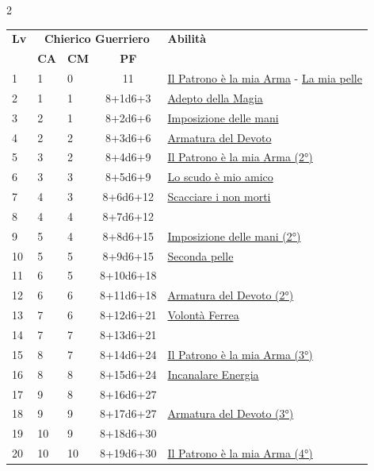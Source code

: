 {\begin{multicols}{2}


\noindent\begin{tabularx}{\linewidth}{p{0.55cm}|p{0.55cm}p{0.55cm}c|X|}
	\toprule
\rowcolor{gray!20}	\textbf{Lv} & \multicolumn{3}{c|}{\textbf{Chierico Guerriero}} & \textbf{Abilità} \\
 & \centering\arraybackslash \textbf{CA} & \centering\arraybackslash \textbf{CM} & \centering\arraybackslash \textbf{PF} & \\
	\toprule
	1 & 1 & 0 & 11 & \hyperlink{Il Patrono è la mia Arma}{Il Patrono è la mia Arma} - \hyperlink{La mia pelle}{La mia pelle}\\
	\rowcolor{gray!20}2 & 1 & 1 & 8+1d6+3 & \hyperlink{Adepto della Magia}{Adepto della Magia}\\
	3 & 2 & 1 & 8+2d6+6 & \hyperlink{Imposizione delle mani}{Imposizione delle mani}\\
	\rowcolor{gray!20}4 & 2 & 2 & 8+3d6+6 & \hyperlink{Armatura del Devoto}{Armatura del Devoto}\\
	5 & 3 & 2 & 8+4d6+9 & \hyperlink{Il Patrono è la mia Arma}{Il Patrono è la mia Arma (2°)}\\
	\rowcolor{gray!20}6 & 3 & 3 & 8+5d6+9 & \hyperlink{Lo scudo è mio amico}{Lo scudo è mio amico}\\
	7 & 4 & 3 & 8+6d6+12 & \hyperlink{Scacciare i non morti}{Scacciare i non morti}\\
	\rowcolor{gray!20}8 & 4 & 4 & 8+7d6+12 & \\
	9 & 5 & 4 & 8+8d6+15 & \hyperlink{Imposizione delle mani}{Imposizione delle mani (2°)}\\
	\rowcolor{gray!20}10 & 5 & 5 & 8+9d6+15 & \hyperlink{Seconda pelle}{Seconda pelle}\\
	11 & 6 & 5 & 8+10d6+18 & \\
	\rowcolor{gray!20}12 & 6 & 6 & 8+11d6+18 & \hyperlink{Armatura del Devoto}{Armatura del Devoto (2°)}\\
	13 & 7 & 6 & 8+12d6+21 & \hyperlink{Volonta' Ferrea}{Volontà Ferrea}\\
	\rowcolor{gray!20}14 & 7 & 7 & 8+13d6+21 & \\
	15 & 8 & 7 & 8+14d6+24 & \hyperlink{Il Patrono è la mia Arma}{Il Patrono è la mia Arma (3°)}\\
	\rowcolor{gray!20}16 & 8 & 8 & 8+15d6+24 & \hyperlink{Incanalare Energia}{Incanalare Energia}\\
	17 & 9 & 8 & 8+16d6+27 & \\
	\rowcolor{gray!20}18 & 9 & 9 & 8+17d6+27 & \hyperlink{Armatura del Devoto}{Armatura del Devoto (3°)}\\
	19 & 10 & 9 & 8+18d6+30 & \\
	\rowcolor{gray!20}20 & 10 & 10 & 8+19d6+30 & \hyperlink{Il Patrono è la mia Arma}{Il Patrono è la mia Arma (4°)}\\
\end{tabularx}


\end{multicols}}
